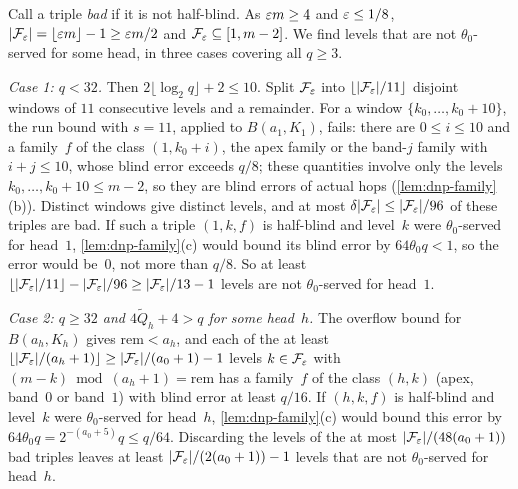 \begin{outline}
Call a triple \emph{bad} if it is not half-blind. As $\varepsilon m\ge4$ and $\varepsilon\le1/8$,
$\lvert \mathcal F_\varepsilon \rvert=\lfloor\varepsilon m\rfloor-1\ge\varepsilon m/2$ and $\mathcal F_\varepsilon\subseteq[1,m-2]$. We find levels that are
not $\theta_0$-served for some head, in three cases covering all $q\ge3$.

\emph{Case 1: $q<32$.} Then $2\lfloor\log_2q\rfloor+2\le10$. Split $\mathcal F_\varepsilon$ into
$\lfloor\lvert \mathcal F_\varepsilon \rvert/11\rfloor$ disjoint windows of $11$ consecutive levels and a remainder. For a window
$\{k_0,\dots,k_0+10\}$, the run bound with $s=11$, applied to $B(a_1,K_1)$, fails: there are $0\le i\le10$ and a family~$f$
of the class $(1,k_0+i)$, the apex family or the band-$j$ family with $i+j\le10$, whose blind error exceeds $q/8$; these
quantities involve only the levels $k_0,\dots,k_0+10\le m-2$, so they are blind errors of actual hops
(\cref{lem:dnp-family}(b)). Distinct windows give distinct levels, and at most
$\delta\lvert \mathcal F_\varepsilon \rvert\le\lvert \mathcal F_\varepsilon \rvert/96$ of these triples are bad. If such a triple $(1,k,f)$ is
half-blind and level~$k$ were $\theta_0$-served for head~$1$, \cref{lem:dnp-family}(c) would bound its blind error by
$64\theta_0q<1$, so the error would be~$0$, not more than $q/8$. So at least
$\lfloor\lvert \mathcal F_\varepsilon \rvert/11\rfloor-\lvert \mathcal F_\varepsilon \rvert/96\ge\lvert \mathcal F_\varepsilon \rvert/13-1$ levels are not
$\theta_0$-served for head~$1$.

\emph{Case 2: $q\ge32$ and $4\tilde Q_h+4>q$ for some head~$h$.} The overflow bound for $B(a_h,K_h)$ gives
$\mathrm{rem}<a_h$, and each of the at least $\lfloor\lvert \mathcal F_\varepsilon \rvert/(a_h+1)\rfloor\ge\lvert \mathcal F_\varepsilon \rvert/(a_0+1)-1$
levels $k\in\mathcal F_\varepsilon$ with $(m-k)\bmod(a_h+1)=\mathrm{rem}$ has a family~$f$ of the class $(h,k)$ (apex, band~$0$ or
band~$1$) with blind error at least $q/16$. If $(h,k,f)$ is half-blind and level~$k$ were $\theta_0$-served for head~$h$,
\cref{lem:dnp-family}(c) would bound this error by $64\theta_0q=2^{-(a_0+5)}q\le q/64$. Discarding the levels of the at
most $\lvert \mathcal F_\varepsilon \rvert/(48(a_0+1))$ bad triples leaves at least $\lvert \mathcal F_\varepsilon \rvert/(2(a_0+1))-1$ levels that
are not $\theta_0$-served for head~$h$.


\end{outline}
